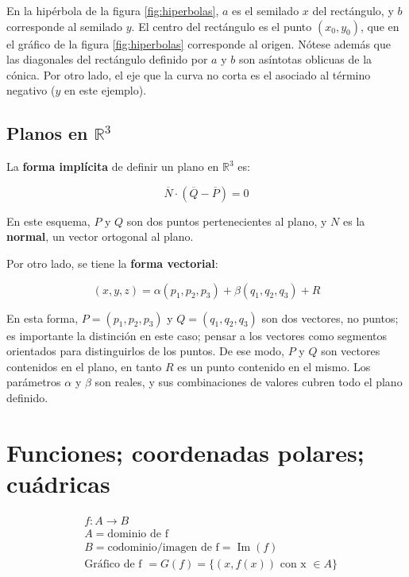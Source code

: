\documentclass{article}
\renewcommand{\Bbb}{\mathbb}
\begin{document}
En la hipérbola de la figura \ref{fig:hiperbolas}, $a$ es el semilado $x$ del rectángulo, y $b$ corresponde al semilado $y$. El centro del rectángulo es el punto $(x_0, y_0)$, que en el gráfico de la figura \ref{fig:hiperbolas} corresponde al origen. 
Nótese además que las diagonales del rectángulo definido por $a$ y $b$ son asíntotas oblicuas de la cónica. Por otro lado, el eje que la curva no corta es el asociado al término negativo ($y$ en este ejemplo).

\subsection{Planos en \texorpdfstring{$\Bbb R^3$}{R3}}

La \textbf{forma implícita} de definir un plano en $\Bbb R^3$ es:

\begin{equation}
\overline{N} \cdot (\overline{Q} - \overline{P}) = 0
\end{equation}

En este esquema, $P$ y $Q$ son dos puntos pertenecientes al plano, y $N$ es la \textbf{normal}, un vector ortogonal al plano.

Por otro lado, se tiene la \textbf{forma vectorial}:

\begin{equation}
(x,y,z) = \alpha (p_1, p_2, p_3) + \beta (q_1, q_2, q_3) + R
\end{equation}

En esta forma, $P = (p_1, p_2, p_3)$ y $Q = (q_1, q_2, q_3)$ son dos vectores, no puntos; es importante la distinción en este caso; pensar a los vectores como segmentos orientados para distinguirlos de los puntos. De ese modo, $P$ y $Q$ son vectores contenidos en el plano, en tanto $R$ es un punto contenido en el mismo. Los parámetros $\alpha$ y $\beta$ son reales, y sus combinaciones de valores cubren todo el plano definido. 

\section{Funciones; coordenadas polares; cuádricas}

\begin{subequations}
\begin{align}
&f: A \rightarrow B \\
&A = \text{dominio de f} \\
&B = \text{codominio/imagen de f} = \mathop{Im}(f) \\
&\text{Gráfico de f } = G(f) = \{ (x, f(x)) \text{ con x } \in A \}
\end{align}
\end{subequations}
\end{document}
